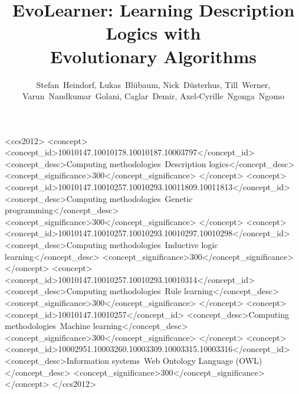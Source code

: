 \title[EvoLearner: Learning Description Logics with Evolutionary Algorithms]{EvoLearner: Learning Description Logics with \texorpdfstring{\\}{} Evolutionary Algorithms}


\author{%
Stefan~Heindorf,
Lukas~Blübaum,
Nick~Düsterhus,
Till~Werner,
Varun~Nandkumar~Golani,
Caglar~Demir,
Axel-Cyrille~Ngonga~Ngomo}

\renewcommand{\shortauthors}{Heindorf et al.}

\begin{CCSXML}
<ccs2012>
  <concept>
    <concept_id>10010147.10010178.10010187.10003797</concept_id>
    <concept_desc>Computing methodologies~Description logics</concept_desc>
    <concept_significance>300</concept_significance>
  </concept>
  <concept>
    <concept_id>10010147.10010257.10010293.10011809.10011813</concept_id>
    <concept_desc>Computing methodologies~Genetic programming</concept_desc>
    <concept_significance>300</concept_significance>
  </concept>
  <concept>
    <concept_id>10010147.10010257.10010293.10010297.10010298</concept_id>
    <concept_desc>Computing methodologies~Inductive logic learning</concept_desc>
    <concept_significance>300</concept_significance>
  </concept>
  <concept>
    <concept_id>10010147.10010257.10010293.10010314</concept_id>
    <concept_desc>Computing methodologies~Rule learning</concept_desc>
    <concept_significance>300</concept_significance>
  </concept>
  <concept>
    <concept_id>10010147.10010257</concept_id>
    <concept_desc>Computing methodologies~Machine learning</concept_desc>
    <concept_significance>300</concept_significance>
  </concept>
  <concept>
    <concept_id>10002951.10003260.10003309.10003315.10003316</concept_id>
    <concept_desc>Information systems~Web Ontology Language (OWL)</concept_desc>
    <concept_significance>300</concept_significance>
  </concept>
 </ccs2012>
\end{CCSXML}


